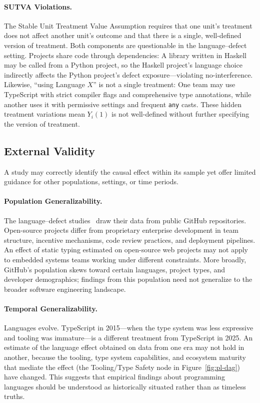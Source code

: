 \paragraph{SUTVA Violations.}
The Stable Unit Treatment Value Assumption requires that one unit's treatment does not affect another unit's outcome and that there is a single, well-defined version of treatment.
Both components are questionable in the language--defect setting.
Projects share code through dependencies: A library written in Haskell may be called from a Python project, so the Haskell project's language choice indirectly affects the Python project's defect exposure---violating no-interference.
Likewise, ``using Language $X$'' is not a single treatment: One team may use TypeScript with strict compiler flags and comprehensive type annotations, while another uses it with permissive settings and frequent \texttt{any} casts.
These hidden treatment variations mean $Y_i(1)$ is not well-defined without further specifying the version of treatment.

\subsection{External Validity}

A study may correctly identify the causal effect within its sample yet offer limited guidance for other populations, settings, or time periods.

\paragraph{Population Generalizability.}
The language--defect studies~\cite{DBLP:conf/sigsoft/RayPFD14, DBLP:journals/toplas/BergerHMVV19} draw their data from public GitHub repositories.
Open-source projects differ from proprietary enterprise development in team structure, incentive mechanisms, code review practices, and deployment pipelines.
An effect of static typing estimated on open-source web projects may not apply to embedded systems teams working under different constraints.
More broadly, GitHub's population skews toward certain languages, project types, and developer demographics; findings from this population need not generalize to the broader software engineering landscape.

\paragraph{Temporal Generalizability.}
Languages evolve.
TypeScript in 2015---when the type system was less expressive and tooling was immature---is a different treatment from TypeScript in 2025.
An estimate of the language effect obtained on data from one era may not hold in another, because the tooling, type system capabilities, and ecosystem maturity that mediate the effect (the Tooling/Type Safety node in Figure~\ref{fig:pl-dag}) have changed.
This suggests that empirical findings about programming languages should be understood as historically situated rather than as timeless truths.

